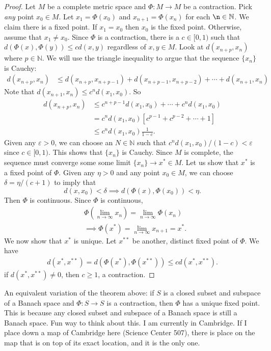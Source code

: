 \documentclass[11pt]{article}
\theoremstyle{definition}
\newcommand{\N}{\mathbb{N}}
\begin{document}
\begin{proof}
    Let $M$ be a complete metric space and $\Phi: M\to M$ be a contraction. Pick \textit{any} point $x_0\in M$. Let $x_1=\Phi(x_0)$ and $x_{n+1}=\Phi(x_{n})$ for each $\n\in \N$. We claim there is a fixed point. If $x_1=x_0$ then $x_0$ is the fixed point. Otherwise, assume that $x_1\neq x_0$. Since $\Phi$ is a contraction, there is a $c\in[0,1)$ such that $d(\Phi(x),\Phi(y))\leq cd(x,y)$ regardless of $x,y\in M$. Look at $d(x_{n+p},x_n)$ where $p\in \N$. We will use the triangle inequality to argue that the sequence $\{x_n\}$ is Cauchy:
    \begin{align*}
        d(x_{n+p},x_n)&\leq d(x_{n+p},x_{n+p-1})+d(x_{n+p-1},x_{n+p-2})+\cdots+d(x_{n+1},x_n)
    \end{align*}
    Note that $d(x_{n+1},x_n)\leq c^n d(x_1,x_0)$. So 
    \begin{align*}
        d(x_{n+p},x_n)&\leq c^{n+p-1}d(x_1,x_0)+\cdots +c^n d(x_1,x_0)\\
        &=c^n d(x_1,x_0) \left[c^{p-1}+c^{p-2}+\cdots+1\right]\\
        &\leq c^n d(x_1,x_0) \frac{1}{1-c}.
    \end{align*}
    Given any $\varepsilon>0$, we can choose an $N\in \N$ such that $c^nd(x_1,x_0)/(1-c)<\varepsilon$ since $c\in [0,1)$. This shows that $\{x_n\}$ is Cauchy. Since $M$ is complete, the sequence must converge some some limit $\{x_n\}\to x^*\in M$. Let us show that $x^*$ is a fixed point of $\Phi$. Given any $\eta>0$ and any point $x_0\in M$, we can choose $\delta=\eta/(c+1)$ to imply that
    $$
    d(x,x_0)<\delta\implies  d(\Phi(x),\Phi(x_0))<\eta.
    $$
    Then $\Phi$ is continuous. Since $\Phi$ is continuous,
    \begin{align*}
        &\Phi\left(\lim_{n\to \infty} x_n\right)=\lim_{n\to \infty} \Phi(x_n)\\
        &\implies \Phi(x^*)=\lim_{n\to\infty} x_{n+1}=x^*.
    \end{align*}
    We now show that $x^*$ is unique. Let $x^{**}$ be another, distinct fixed point of $\Phi$. We have
    \begin{align*}
        d(x^{*},x^{**})=d(\Phi(x^*),\Phi(x^{**}))\leq cd(x^*,x^{**}).
    \end{align*}
    if $d(x^*,x^{**})\neq 0$, then $c\geq 1$, a contraction.
\end{proof}

\note An equivalent variation of the theorem above: if $S$ is a closed subset and subspace of a Banach space and $\Phi:S\to S$ is a contraction, then $\Phi$ has a unique fixed point. This is because any closed subset and subspace of a Banach space is still a Banach space.
\note Fun way to think about this. I am currently in Cambridge. If I place down a map of Cambridge here (Science Center 507), there is place on the map that is on top of its exact location, and it is the only one.
\end{document}
